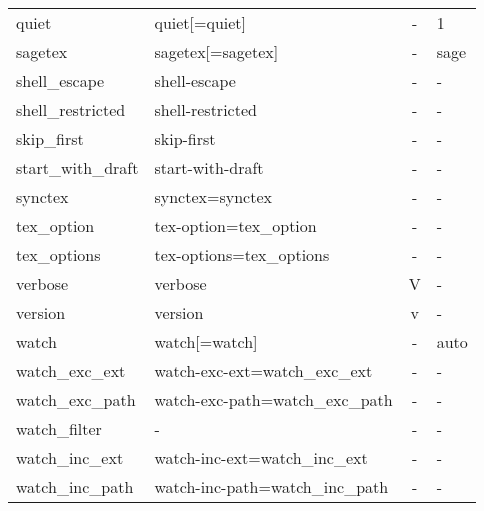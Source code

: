 \begin{longtable}{llcX}
quiet & quiet[=quiet] & - & 1 \\
sagetex & sagetex[=sagetex] & - & sage \\
shell\_escape & shell-escape & - & - \\
shell\_restricted & shell-restricted & - & - \\
skip\_first & skip-first & - & - \\
start\_with\_draft & start-with-draft & - & - \\
synctex & synctex=synctex & - & - \\
tex\_option & tex-option=tex\_option & - & - \\
tex\_options & tex-options=tex\_options & - & - \\
verbose & verbose & V & - \\
version & version & v & - \\
watch & watch[=watch] & - & auto \\
watch\_exc\_ext & watch-exc-ext=watch\_exc\_ext & - & - \\
watch\_exc\_path & watch-exc-path=watch\_exc\_path & - & - \\
watch\_filter & - & - & - \\
watch\_inc\_ext & watch-inc-ext=watch\_inc\_ext & - & - \\
watch\_inc\_path & watch-inc-path=watch\_inc\_path & - & - \\
\bottomrule
\end{longtable}